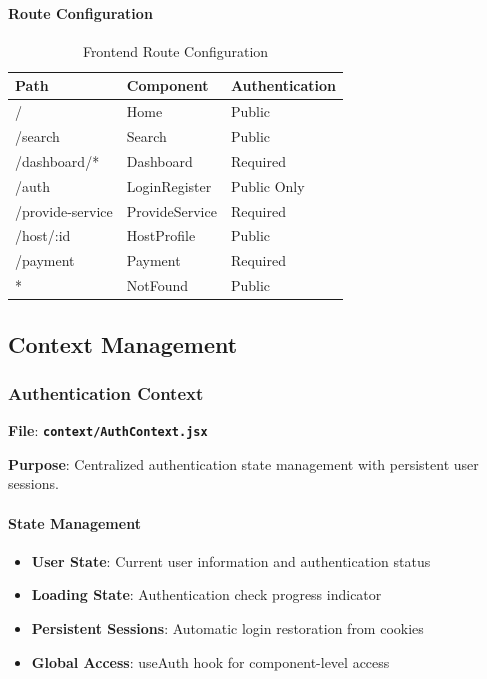 \documentclass[12pt,a4paper]{article}
\newcommand{\file}[1]{\textbf{\texttt{#1}}}
\begin{document}
\paragraph{Route Configuration}
\begin{table}[H]
\centering
\small
\begin{tabular}{@{}lll@{}}
\toprule
\textbf{Path} & \textbf{Component} & \textbf{Authentication} \\
\midrule
/ & Home & Public \\
/search & Search & Public \\
/dashboard/* & Dashboard & Required \\
/auth & LoginRegister & Public Only \\
/provide-service & ProvideService & Required \\
/host/:id & HostProfile & Public \\
/payment & Payment & Required \\
* & NotFound & Public \\
\bottomrule
\end{tabular}
\caption{Frontend Route Configuration}
\label{tab:frontend-routes}
\end{table}

\subsection{Context Management}
\label{subsec:context-management}

\subsubsection{Authentication Context}
\label{subsubsec:auth-context}

\textbf{File}: \file{context/AuthContext.jsx}

\textbf{Purpose}: Centralized authentication state management with persistent user sessions.

\paragraph{State Management}
\begin{itemize}
\item \textbf{User State}: Current user information and authentication status
\item \textbf{Loading State}: Authentication check progress indicator
\item \textbf{Persistent Sessions}: Automatic login restoration from cookies
\item \textbf{Global Access}: useAuth hook for component-level access
\end{itemize}
\end{document}
